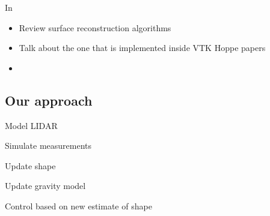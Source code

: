 In 
\begin{itemize}
    \item Review surface reconstruction algorithms
    \item Talk about the one that is implemented inside VTK Hoppe papers
    \item 
\end{itemize}

\subsection{Our approach}

Model LIDAR

Simulate measurements

Update shape

Update gravity model

Control based on new estimate of shape


